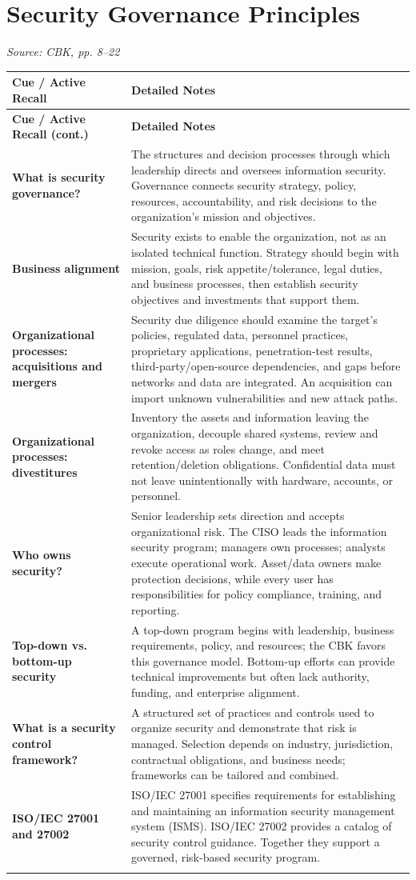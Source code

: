 \documentclass[10pt,letterpaper]{article}
\makeatletter
\newenvironment{cornell}
{\rowcolors{2}{white}{notebg}\begin{longtable}{@{}>{\raggedright\arraybackslash\columncolor{cuebg}\color{navy}\bfseries}p{0.285\textwidth}>{\raggedright\arraybackslash}p{0.65\textwidth}@{}}
\rowcolor{navy}\color{white}\textbf{Cue / Active Recall} & \color{white}\textbf{Detailed Notes}\\ \hline
\endfirsthead
\rowcolor{navy}\color{white}\textbf{Cue / Active Recall (cont.)} & \color{white}\textbf{Detailed Notes}\\ \hline
\endhead}
{\end{longtable}}
\newcommand{\noterow}[2]{#1 & #2\\\arrayrulecolor{line}\hline}
\newcommand{\source}[1]{\par{\footnotesize\color{teal}\textit{Source: CBK, #1}}\par}
\makeatother
\begin{document}
\section{\color{navy}Security Governance Principles}
\source{pp. 8--22}
\begin{cornell}
\noterow{What is security governance?}{The structures and decision processes through which leadership directs and oversees information security. Governance connects security strategy, policy, resources, accountability, and risk decisions to the organization's mission and objectives.}
\noterow{Business alignment}{Security exists to enable the organization, not as an isolated technical function. Strategy should begin with mission, goals, risk appetite/tolerance, legal duties, and business processes, then establish security objectives and investments that support them.}
\noterow{Organizational processes: acquisitions and mergers}{Security due diligence should examine the target's policies, regulated data, personnel practices, proprietary applications, penetration-test results, third-party/open-source dependencies, and gaps before networks and data are integrated. An acquisition can import unknown vulnerabilities and new attack paths.}
\noterow{Organizational processes: divestitures}{Inventory the assets and information leaving the organization, decouple shared systems, review and revoke access as roles change, and meet retention/deletion obligations. Confidential data must not leave unintentionally with hardware, accounts, or personnel.}
\noterow{Who owns security?}{Senior leadership sets direction and accepts organizational risk. The CISO leads the information security program; managers own processes; analysts execute operational work. Asset/data owners make protection decisions, while every user has responsibilities for policy compliance, training, and reporting.}
\noterow{Top-down vs. bottom-up security}{A top-down program begins with leadership, business requirements, policy, and resources; the CBK favors this governance model. Bottom-up efforts can provide technical improvements but often lack authority, funding, and enterprise alignment.}
\noterow{What is a security control framework?}{A structured set of practices and controls used to organize security and demonstrate that risk is managed. Selection depends on industry, jurisdiction, contractual obligations, and business needs; frameworks can be tailored and combined.}
\noterow{ISO/IEC 27001 and 27002}{ISO/IEC 27001 specifies requirements for establishing and maintaining an information security management system (ISMS). ISO/IEC 27002 provides a catalog of security control guidance. Together they support a governed, risk-based security program.}

\end{cornell}
\end{document}
